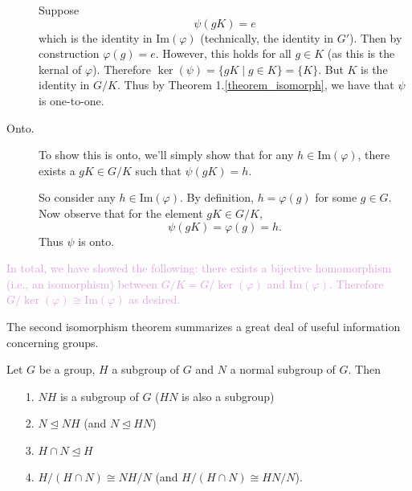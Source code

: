 \documentclass[12pt,letterpaper]{algebra_book}
\newcommand{\normal}{\unlhd}
\newcommand{\im}{\mbox{Im}}
\renewcommand{\phi}{\varphi}
\theoremstyle{definition}
\begin{document}
\begin{prf}
\begin{description}
            Suppose 
            \[
                \psi(gK) = e
            \] which is the identity in $\im(\phi)$ (technically, the identity in $G'$). Then by construction $\phi(g) = e.$ 
            However, this holds for all $g \in K$ (as this is the
            kernal of $\phi$). Therefore
            $\ker(\psi) = \{gK \mid g \in K\} = \{K\}$. But $K$ is the
            identity in $G/K$. Thus by Theorem
            1.\ref{theorem_isomorph}, we have that $\psi$ is
            one-to-one.
            
            \item[Onto.] To show this is onto, we'll simply show that
            for any $h \in \im(\phi)$, there exists a $gK \in G/K$
            such that $\psi(gK) = h$. 

            So consider any $h \in \im(\phi)$. By definition, $h = \phi(g)$ for
            some $g \in G$. Now observe that for the element $gK \in
            G/K$, 
            \[
                \psi(gK) = \phi(g) = h.
            \]
            Thus $\psi$ is onto.
        \end{description}
        \textcolor{Plum}{In total, we have showed the following: there exists a
        bijective homomorphism (i.e., an isomorphism) between $G/K = G/\ker(\phi)$ and
        $\im(\phi)$. Therefore $G/\ker(\phi) \cong \im(\phi)$ as desired.}
    \end{prf}
    The second isomorphism theorem summarizes a great deal of useful
    information concerning groups. 

    \begin{thm}
        Let $G$ be a group, $H$ a subgroup of $G$ and $N$ a normal
        subgroup of $G$. Then 
        \begin{itemize}
            \item[1.] $NH$ is a subgroup of $G$ ($HN$ is also a subgroup)
            \item[2.] $N \normal NH$ (and $N \normal HN$)
            \item[3.] $H \cap N \normal H$ 
            \item[4.] $H/(H \cap N) \cong NH/N$ (and $H/(H \cap N) \cong HN/N$).
        \end{itemize}
    \end{thm}
\end{document}
